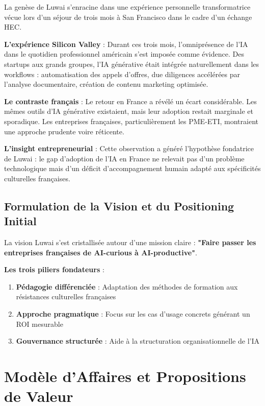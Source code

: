 \documentclass[12pt,a4paper]{report}
\begin{document}
La genèse de Luwai s'enracine dans une expérience personnelle transformatrice vécue lors d'un séjour de trois mois à San Francisco dans le cadre d'un échange HEC.

\textbf{L'expérience Silicon Valley} : Durant ces trois mois, l'omniprésence de l'IA dans le quotidien professionnel américain s'est imposée comme évidence. Des startups aux grands groupes, l'IA générative était intégrée naturellement dans les workflows : automatisation des appels d'offres, due diligences accélérées par l'analyse documentaire, création de contenu marketing optimisée.

\textbf{Le contraste français} : Le retour en France a révélé un écart considérable. Les mêmes outils d'IA générative existaient, mais leur adoption restait marginale et sporadique. Les entreprises françaises, particulièrement les PME-ETI, montraient une approche prudente voire réticente.

\textbf{L'insight entrepreneurial} : Cette observation a généré l'hypothèse fondatrice de Luwai : le gap d'adoption de l'IA en France ne relevait pas d'un problème technologique mais d'un déficit d'accompagnement humain adapté aux spécificités culturelles françaises.

\subsection{Formulation de la Vision et du Positioning Initial}

La vision Luwai s'est cristallisée autour d'une mission claire : \textbf{"Faire passer les entreprises françaises de AI-curious à AI-productive"}.

\textbf{Les trois piliers fondateurs} :
\begin{enumerate}
\item \textbf{Pédagogie différenciée} : Adaptation des méthodes de formation aux résistances culturelles françaises
\item \textbf{Approche pragmatique} : Focus sur les cas d'usage concrets générant un ROI mesurable
\item \textbf{Gouvernance structurée} : Aide à la structuration organisationnelle de l'IA
\end{enumerate}

\section{Modèle d'Affaires et Propositions de Valeur}
\end{document}
